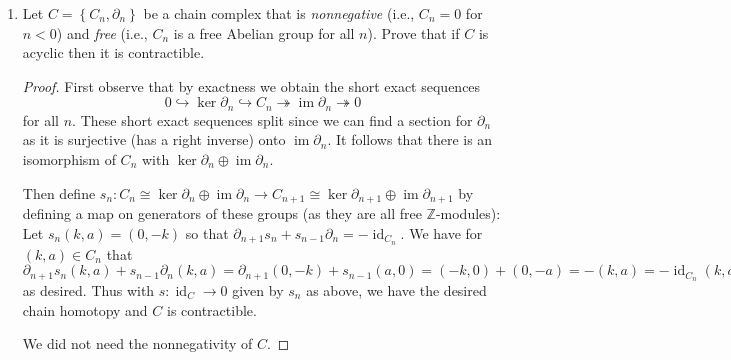 \documentclass[11pt]{article}
\newcommand{\cbr}[1]{\left\{#1\right\}}
\DeclareMathOperator{\id}{id}
\DeclareMathOperator{\im}{im}
\begin{document}
\begin{enumerate}
\begin{proof}
        Observe first that within the chain complex is a short exact sequence $0\to \mathbb{Z}\xrightarrow{\cdot 2}\mathbb{Z}\xrightarrow{\mathrm{mod}\ 2} \mathbb{Z}/2\mathbb{Z}\to 0$ which is \textit{not} split since the only homomorphism $\mathbb{Z}/2\mathbb{Z}\to \mathbb{Z}$ is the zero homomorphism. [The order of $[1]$ is $2$ so the only element it could be sent to in $\mathbb{Z}$ is zero.] Suppose we had a chain homotopy $s\colon \id\to 0$. Then $2s_{\mathbb{Z}} + 0(\mathrm{mod}\ 2) = 0-\id$ so that $\id = 2(-s_{\mathbb{Z}})$. Thus $-s_\mathbb{Z}$ is a homomorphism such that $\cdot 2\circ -s_\mathbb{Z}$ is the identity on $\mathbb{Z}$, which implies that the short exact sequence above splits, a contradiction. Hence the chain complex could not be contractible.
    \end{proof}
    \item Let $C = \cbr{C_n,\partial_n}$ be a chain complex that is \textit{nonnegative} (i.e., $C_n = 0$ for $n< 0$) and \textit{free} (i.e., $C_n$ is a free Abelian group for all $n$). Prove that if $C$ is acyclic then it is contractible. \begin{proof}
        First observe that by exactness we obtain the short exact sequences \[0\hookrightarrow\ker\partial_n\hookrightarrow C_n\twoheadrightarrow \im\partial_n\twoheadrightarrow 0\] for all $n$. These short exact sequences split since we can find a section for $\partial_n$ as it is surjective (has a right inverse) onto $\im\partial_n$. It follows that there is an isomorphism of $C_n$ with $\ker\partial_n\oplus \im\partial_n$. 

        Then define $s_n\colon C_n\cong \ker\partial_n\oplus \im\partial_n\to C_{n+1}\cong \ker\partial_{n+1}\oplus \im\partial_{n+1}$ by defining a map on generators of these groups (as they are all free $\mathbb{Z}$-modules): Let $s_n(k,a) = (0,-k)$ so that $\partial_{n+1}s_n + s_{n-1}\partial_n = -\id_{C_n}$. We have for $(k,a)\in C_n$ that $\partial_{n+1}s_n(k,a) + s_{n-1}\partial_n(k,a) = \partial_{n+1}(0,-k) + s_{n-1}(a,0) = (-k,0) + (0,-a) = -(k,a) = -\id_{C_n}(k,a)$ as desired. Thus with $s\colon \id_{C}\to 0$ given by $s_n$ as above, we have the desired chain homotopy and $C$ is contractible.
        
        We did not need the nonnegativity of $C$.
        
    \end{proof}
\end{enumerate}
\end{document}
